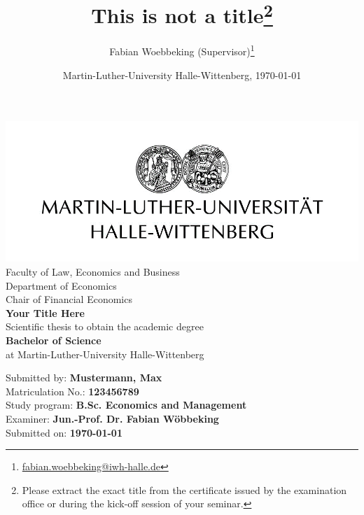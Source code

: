 \documentclass[11pt,a4paper]{article}
\author{Fabian Woebbeking (Supervisor)\thanks{\href{mailtofabian.woebbeking@iwh-halle.de}{fabian.woebbeking@iwh-halle.de}}}
\title{
This is not a title\thanks{Please extract the exact title from the certificate issued by the examination office or during the kick-off session of your seminar.}
}
\date{Martin-Luther-University Halle-Wittenberg, \monthyeardate\today}
\begin{document}
\begin{titlepage}
\begin{center}
\includegraphics[width=\linewidth]{template.png}\\
Faculty of Law, Economics and Business\\
Department of Economics\\
Chair of Financial Economics\\
\vspace{40pt}
\Large\textbf{Your Title Here}\\
\vspace{40pt}
\normalsize
Scientific thesis to obtain the academic degree\\
\textbf{Bachelor of Science}\\
at Martin-Luther-University Halle-Wittenberg\\
\end{center}
\vfill
\begin{flushleft}
\normalsize
Submitted by: \textbf{Mustermann, Max}\\
Matriculation No.: \textbf{123456789}\\
Study program: \textbf{B.Sc. Economics and Management}\\
Examiner: \textbf{Jun.-Prof. Dr. Fabian Wöbbeking}\\
Submitted on: \textbf{\today}
\end{flushleft}
\end{titlepage}
\clearpage
\end{document}
